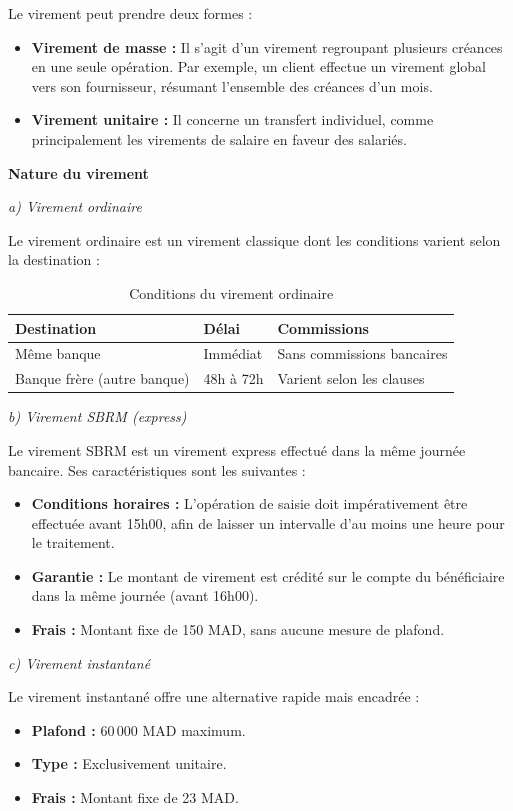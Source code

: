 Le virement peut prendre deux formes :
\begin{itemize}
  \item \textbf{Virement de masse :} Il s'agit d'un virement regroupant plusieurs créances en une seule opération. Par exemple, un client effectue un virement global vers son fournisseur, résumant l'ensemble des créances d'un mois.
  \item \textbf{Virement unitaire :} Il concerne un transfert individuel, comme principalement les virements de salaire en faveur des salariés.
\end{itemize}

\medskip\textbf{Nature du virement}

\medskip\textit{a) Virement ordinaire}

Le virement ordinaire est un virement classique dont les conditions varient selon la destination :

\begin{table}[h!]
\centering
\begin{tabularx}{\textwidth}{X X X}
\toprule
Destination & Délai & Commissions \\
\midrule
Même banque & Immédiat & Sans commissions bancaires \\
Banque frère (autre banque) & 48h à 72h & Varient selon les clauses \\
\bottomrule
\end{tabularx}
\caption{Conditions du virement ordinaire}
\end{table}

\medskip\textit{b) Virement SBRM (express)}

Le virement SBRM est un virement express effectué dans la même journée bancaire. Ses caractéristiques sont les suivantes :
\begin{itemize}
  \item \textbf{Conditions horaires :} L'opération de saisie doit impérativement être effectuée avant 15h00, afin de laisser un intervalle d'au moins une heure pour le traitement.
  \item \textbf{Garantie :} Le montant de virement est crédité sur le compte du bénéficiaire dans la même journée (avant 16h00).
  \item \textbf{Frais :} Montant fixe de 150 MAD, sans aucune mesure de plafond.
\end{itemize}

\medskip\textit{c) Virement instantané}

Le virement instantané offre une alternative rapide mais encadrée :
\begin{itemize}
  \item \textbf{Plafond :} 60\,000 MAD maximum.
  \item \textbf{Type :} Exclusivement unitaire.
  \item \textbf{Frais :} Montant fixe de 23 MAD.
\end{itemize}

